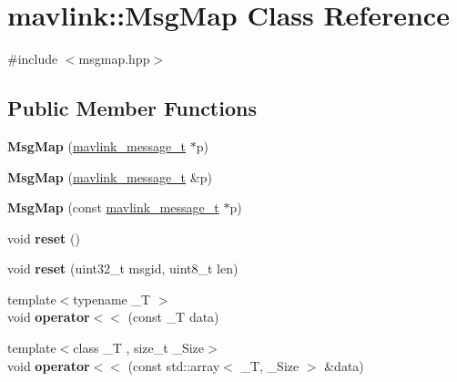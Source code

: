 \hypertarget{classmavlink_1_1MsgMap}{}\section{mavlink\+:\+:Msg\+Map Class Reference}
\label{classmavlink_1_1MsgMap}


{\ttfamily \#include $<$msgmap.\+hpp$>$}

\subsection*{Public Member Functions}
\begin{DoxyCompactItemize}
\item 
\mbox{\label{classmavlink_1_1MsgMap_a584e0a807eb17833430f919d1d0952f3}} 
{\bfseries Msg\+Map} (\hyperlink{struct____mavlink__message}{mavlink\+\_\+message\+\_\+t} $\ast$p)
\item 
\mbox{\label{classmavlink_1_1MsgMap_ac901b93ec973e7dbdb8ef8ceace9d8b0}} 
{\bfseries Msg\+Map} (\hyperlink{struct____mavlink__message}{mavlink\+\_\+message\+\_\+t} \&p)
\item 
\mbox{\label{classmavlink_1_1MsgMap_a7e797cf94f826dfe13ff2e412b49e743}} 
{\bfseries Msg\+Map} (const \hyperlink{struct____mavlink__message}{mavlink\+\_\+message\+\_\+t} $\ast$p)
\item 
\mbox{\label{classmavlink_1_1MsgMap_a2eae010a75187fdc08da24d9bb53a3ca}} 
void {\bfseries reset} ()
\item 
\mbox{\label{classmavlink_1_1MsgMap_a10c2f9d9a43770eefa072b53d64a9291}} 
void {\bfseries reset} (uint32\+\_\+t msgid, uint8\+\_\+t len)
\item 
\mbox{\label{classmavlink_1_1MsgMap_a79d04c1d99bad57f67763dd3ffc202e5}} 
{\footnotesize template$<$typename \+\_\+T $>$ }\\void {\bfseries operator$<$$<$} (const \+\_\+T data)
\item 
\mbox{\label{classmavlink_1_1MsgMap_aa79388f240280cc4848a63ce0a82073e}} 
{\footnotesize template$<$class \+\_\+T , size\+\_\+t \+\_\+\+Size$>$ }\\void {\bfseries operator$<$$<$} (const std\+::array$<$ \+\_\+T, \+\_\+\+Size $>$ \&data)

\end{DoxyCompactItemize}
